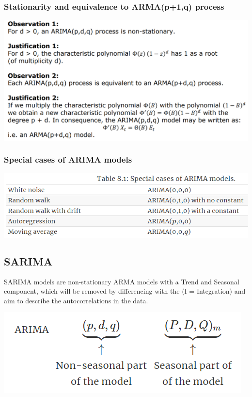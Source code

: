 \documentclass[
]{article}
\begin{document}
\hypertarget{stationarity-and-equivalence-to-armap1q-process}{%
\subsubsection{Stationarity and equivalence to ARMA(p+1,q)
process}\label{stationarity-and-equivalence-to-armap1q-process}}

\includegraphics[width=1\linewidth]{arplus}

\hypertarget{special-cases-of-arima-models}{%
\subsubsection{Special cases of ARIMA
models}\label{special-cases-of-arima-models}}

\includegraphics[width=0.5\linewidth]{arima1}

\hypertarget{sarima}{%
\subsection{SARIMA}\label{sarima}}

SARIMA models are non-stationary ARMA models with a Trend and Seasonal
component, which will be removed by differencing with the (I =
Integration) and aim to describe the autocorrelations in the data.

\includegraphics[width=0.5\linewidth]{sarima}
\end{document}
